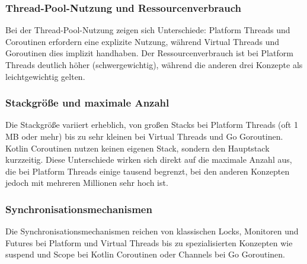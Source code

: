 \documentclass[fontsize=12pt,paper=a4,twoside=semi,parskip=half-,headsepline,headinclude]{scrreprt}
\begin{document}
\subsubsection{Thread-Pool-Nutzung und Ressourcenverbrauch}

Bei der Thread-Pool-Nutzung zeigen sich Unterschiede: Platform Threads und Coroutinen erfordern eine explizite Nutzung, während Virtual Threads und Goroutinen dies implizit handhaben. Der Ressourcenverbrauch ist bei Platform Threads deutlich höher (schwergewichtig), während die anderen drei Konzepte als leichtgewichtig gelten.

\subsubsection{Stackgröße und maximale Anzahl}

Die Stackgröße variiert erheblich, von großen Stacks bei Platform Threads (oft 1 MB oder mehr) bis zu sehr kleinen bei Virtual Threads und Go Goroutinen. Kotlin Coroutinen nutzen keinen eigenen Stack, sondern den Hauptstack kurzzeitig. Diese Unterschiede wirken sich direkt auf die maximale Anzahl aus, die bei Platform Threads einige tausend begrenzt, bei den anderen Konzepten jedoch mit mehreren Millionen sehr hoch ist.

\subsubsection{Synchronisationsmechanismen}

Die Synchronisationsmechanismen reichen von klassischen Locks, Monitoren und Futures bei Platform und Virtual Threads bis zu spezialisierten Konzepten wie suspend und Scope bei Kotlin Coroutinen oder Channels bei Go Goroutinen. 
\end{document}
